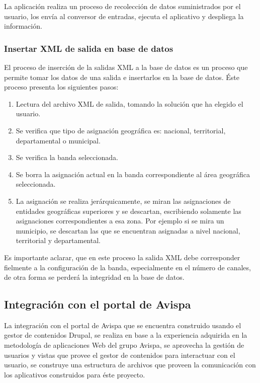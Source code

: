 La aplicación realiza un proceso de recolección de datos suministrados por el usuario, los envía al conversor de entradas, ejecuta el aplicativo y despliega la información.

\subsubsection{Insertar XML de salida en base de datos}

El proceso de inserción de la salidas XML a la base de datos es un proceso que permite tomar los datos de una salida e insertarlos en la base de datos. Éste proceso presenta los siguientes pasos:

\begin{enumerate}
	\item Lectura del archivo XML de salida, tomando la solución que ha elegido el usuario.
	\item Se verifica que tipo de asignación geográfica es: nacional, territorial, departamental o municipal.
	\item Se verifica la banda seleccionada.
	\item Se borra la asignación actual en la banda correspondiente al área geográfica seleccionada.
	\item La asignación se realiza jerárquicamente, se miran las asignaciones de entidades geográficas superiores y se descartan, escribiendo solamente las asignaciones correspondientes a esa zona. Por ejemplo si se mira un municipio, se descartan las que se encuentran asignadas a nivel nacional, territorial y departamental.
\end{enumerate}

Es importante aclarar, que en este proceso la salida XML debe corresponder fielmente a la configuración de la banda, especialmente en el número de canales, de otra forma se perderá la integridad en la base de datos.

\subsection{Integración con el portal de Avispa}

La integración con el portal de Avispa que se encuentra construido usando el gestor de contenidos Drupal\cite{Drupal}, se realiza en base a la experiencia adquirida en la metodología de aplicaciones Web del grupo Avispa, se aprovecha la gestión de usuarios y vistas que provee el gestor de contenidos para interactuar con el usuario, se construye una estructura de archivos que proveen la comunicación con los aplicativos construidos para éste proyecto.

